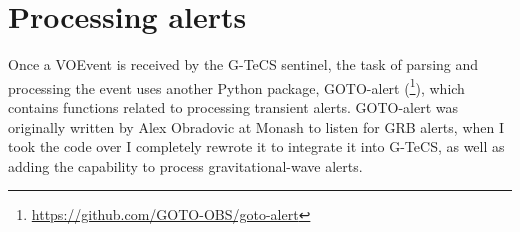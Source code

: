 
\section{Processing alerts}
\label{sec:gotoalert}


\begin{colsection}

Once a VOEvent is received by the G-TeCS sentinel, the task of parsing and processing the event uses another Python package, GOTO-alert (\footnote{\url{https://github.com/GOTO-OBS/goto-alert}}), which  contains functions related to processing transient alerts. GOTO-alert was originally written by Alex Obradovic at Monash to listen for GRB alerts, when I took the code over I completely rewrote it to integrate it into G-TeCS, as well as adding the capability to process gravitational-wave alerts.

\end{colsection}


